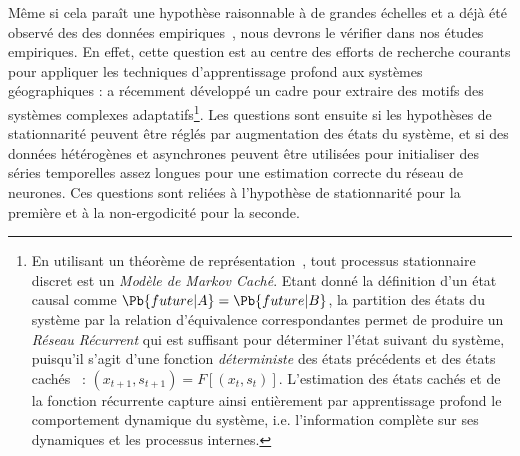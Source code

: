 {Même si cela paraît une hypothèse raisonnable à de grandes échelles et a déjà été observé des des données empiriques~\cite{sanders1992systeme}, nous devrons le vérifier dans nos études empiriques. En effet, cette question est au centre des efforts de recherche courants pour appliquer les techniques d'apprentissage profond aux systèmes géographiques :  a récemment développé un cadre pour extraire des motifs des systèmes complexes adaptatifs\footnote{En utilisant un théorème de représentation~\cite{knight1975predictive}, tout processus stationnaire discret est un \emph{Modèle de Markov Caché}. Etant donné la définition d'un état causal comme $\Pb{future | A} = \Pb{future | B}$, la partition des états du système par la relation d'équivalence correspondantes permet de produire un \emph{Réseau Récurrent} qui est suffisant pour déterminer l'état suivant du système, puisqu'il s'agit d'une fonction \emph{déterministe} des états précédents et des états cachés~\cite{shalizi2001computational} : $(x_{t+1},s_{t+1}) = F\left[(x_t,s_t)\right]$. L'estimation des états cachés et de la fonction récurrente capture ainsi entièrement par apprentissage profond le comportement dynamique du système, i.e. l'information complète sur ses dynamiques et les processus internes.}. Les questions sont ensuite si les hypothèses de stationnarité peuvent être réglés par augmentation des états du système, et si des données hétérogènes et asynchrones peuvent être utilisées pour initialiser des séries temporelles assez longues pour une estimation correcte du réseau de neurones. 
Ces questions sont reliées à l'hypothèse de stationnarité pour la première et à la non-ergodicité pour la seconde.
}











